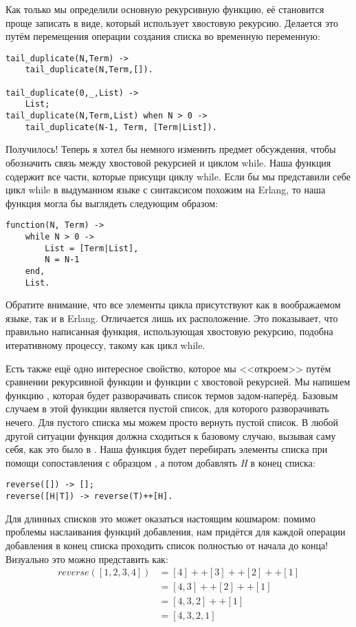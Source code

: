 Как только мы определили основную рекурсивную функцию, её становится проще записать в виде, который использует хвостовую рекурсию. Делается это путём перемещения операции создания списка во временную переменную:
\begin{lstlisting}[style=erlang]
tail_duplicate(N,Term) ->
    tail_duplicate(N,Term,[]).
 
tail_duplicate(0,_,List) ->
    List;
tail_duplicate(N,Term,List) when N > 0 ->
    tail_duplicate(N-1, Term, [Term|List]).
\end{lstlisting}

Получилось! Теперь я хотел бы немного изменить предмет обсуждения, чтобы обозначить связь между хвостовой рекурсией и циклом while. Наша функция  содержит все части, которые присущи циклу while. Если бы мы представили себе цикл while в выдуманном языке с синтаксисом похожим на Erlang, то наша функция могла бы выглядеть следующим образом:
\begin{lstlisting}[style=erlang]
function(N, Term) ->
    while N > 0 ->
        List = [Term|List],
        N = N-1
    end,
    List.
\end{lstlisting}

Обратите внимание, что все элементы цикла присутствуют как в воображаемом языке, так и в Erlang. Отличается лишь их расположение. Это показывает, что правильно написанная функция, использующая хвостовую рекурсию, подобна итеративному процессу, такому как цикл while.

Есть также ещё одно интересное свойство, которое мы <<откроем>> путём сравнении рекурсивной функции и функции с хвостовой рекурсией. Мы напишем функцию , которая будет разворачивать список термов задом\--наперёд. Базовым случаем в этой функции является пустой список, для которого разворачивать нечего. Для пустого списка мы можем просто вернуть пустой список. В любой другой ситуации функция должна сходиться к базовому случаю, вызывая саму себя, как это было в . Наша функция будет перебирать элементы списка при помощи сопоставления с образцом \ops{H|T]}, а потом добавлять \emph{H} в конец списка:
\begin{lstlisting}[style=erlang]
reverse([]) -> [];
reverse([H|T]) -> reverse(T)++[H].
\end{lstlisting}

Для длинных списков это может оказаться настоящим кошмаром: помимо проблемы наслаивания функций добавления, нам придётся для каждой операции добавления в конец списка проходить список полностью от начала до конца! Визуально это можно представить как:
\begin{align*}
reverse([1,2,3,4]) &= [4]++[3]++[2]++[1]\\
&= [4,3]++[2]++[1]\\
&= [4,3,2]++[1]\\
&= [4,3,2,1]\\
\end{align*}

